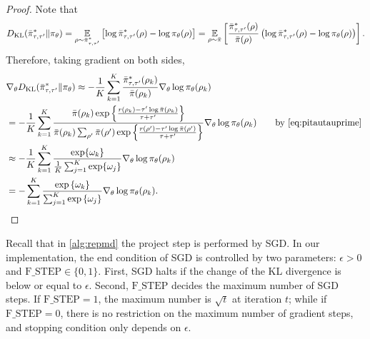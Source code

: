 \begin{proof}
	Note that
	\begin{equation*}
	\label{eq:importance_sampling_kl}
	D_{\mathrm{KL}}(\bar{\pi}_{\tau,\tau^{\prime}}^* \| \pi_\theta) = \operatorname*{\mathbb{E}}_{\rho \sim \bar{\pi}_{\tau,\tau^{\prime}}^* } \left[ \log \bar{\pi}_{\tau,\tau^{\prime}}^*(\rho) - \log \pi_\theta(\rho) \right] = \operatorname*{\mathbb{E}}_{\rho\sim \bar{\pi}} \left[  \frac{\bar{\pi}_{\tau,\tau^{\prime}}^*(\rho)}{\bar{\pi}(\rho)} \left(\log \bar{\pi}_{\tau,\tau^{\prime}}^*(\rho) - \log \pi_\theta(\rho) \right) \right].
	\end{equation*}	
	Therefore, taking gradient on both sides,
	\begin{equation}
	\begin{split}
	&\nabla_{\theta} D_{\mathrm{KL}}(\bar{\pi}_{\tau,\tau^{\prime}}^* \| \pi_\theta) \approx -\frac{1}{K}\sum_{k=1}^K \frac{\bar{\pi}_{\tau,\tau^{\prime}}^* (\rho_k)}{\bar{\pi}(\rho_k)} \nabla_{\theta} \log \pi_\theta(\rho_k)\\ 
	&= -\frac{1}{K}\sum_{k=1}^K \frac{ \bar{\pi}(\rho_k) \exp\left\{ \frac{r(\rho_k)-\tau^{\prime} \log \bar{\pi}(\rho_k) }{ \tau+\tau^{\prime}} \right\} }{\bar{\pi}(\rho_k)  \sum_{\rho^{\prime}}{\bar{\pi}(\rho^{\prime}) \exp\left\{ \frac{r(\rho^{\prime})-\tau^{\prime} \log \bar{\pi}(\rho^{\prime})}{ \tau+\tau^{\prime}} \right\} }  } \nabla_{\theta} \log \pi_\theta(\rho_k) \qquad \text{by \ref{eq:pitautauprime} }  \\
	&\approx -\frac{1}{K}\sum_{k=1}^K \frac{\exp \{\omega_k\}} {\frac{1}{K} \sum_{j=1}^K \exp \{\omega_j\}} \nabla_{\theta} \log \pi_\theta(\rho_k) \\
	&=  -\sum\limits_{k=1}^K{ \frac{ \exp\left\{ \omega_k \right\} }{ \sum_{j=1}^K{ \exp\left\{ \omega_j \right\}}} \nabla_{\theta} \log{\pi_\theta(\rho_k)} } \qedhere.
	\end{split}
	\end{equation}
\end{proof}

Recall that in \cref{alg:repmd} the project step is performed by SGD. In our implementation, the end condition of SGD is controlled by two parameters: $\epsilon > 0$ and $\text{F\_STEP}\in \{0,1 \}$. First, SGD halts if the change of the KL divergence is below or equal to $\epsilon$. Second, $\text{F\_STEP}$ decides the maximum number of SGD steps. If $\text{F\_STEP}=1$, the maximum number is $\sqrt{t}$ at iteration $t$; while if $\text{F\_STEP}=0$, there is no restriction on the maximum number of gradient steps, and stopping condition only depends on $\epsilon$.

